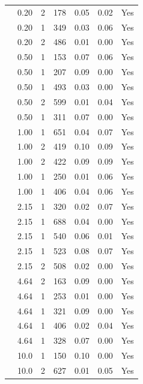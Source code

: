 \begin{longtable}{ | M{2.0cm} | M{2.0cm} | M{1.5cm} | M{1.5cm} | M{2.0cm} | M{2.0cm} | M{1.5cm} | }
                 & 0.20 & 2 & 178 & 0.05 & 0.02 & Yes\\
                 & 0.20 & 1 & 349 & 0.03 & 0.06 & Yes\\
                 & 0.20 & 2 & 486 & 0.01 & 0.00 & Yes\\
                 & 0.50 & 1 & 153 & 0.07 & 0.06 & Yes\\
                 & 0.50 & 1 & 207 & 0.09 & 0.00 & Yes\\
                 & 0.50 & 1 & 493 & 0.03 & 0.00 & Yes\\
                 & 0.50 & 2 & 599 & 0.01 & 0.04 & Yes\\
                 & 0.50 & 1 & 311 & 0.07 & 0.00 & Yes\\
                 & 1.00 & 1 & 651 & 0.04 & 0.07 & Yes\\
                 & 1.00 & 2 & 419 & 0.10 & 0.09 & Yes\\
                 & 1.00 & 2 & 422 & 0.09 & 0.09 & Yes\\
                 & 1.00 & 1 & 250 & 0.01 & 0.06 & Yes\\
                 & 1.00 & 1 & 406 & 0.04 & 0.06 & Yes\\
                 & 2.15 & 1 & 320 & 0.02 & 0.07 & Yes\\
                 & 2.15 & 1 & 688 & 0.04 & 0.00 & Yes\\
                 & 2.15 & 1 & 540 & 0.06 & 0.01 & Yes\\
                 & 2.15 & 1 & 523 & 0.08 & 0.07 & Yes\\
                 & 2.15 & 2 & 508 & 0.02 & 0.00 & Yes\\
                 & 4.64 & 2 & 163 & 0.09 & 0.00 & Yes\\
                 & 4.64 & 1 & 253 & 0.01 & 0.00 & Yes\\
                 & 4.64 & 1 & 321 & 0.09 & 0.00 & Yes\\
                 & 4.64 & 1 & 406 & 0.02 & 0.04 & Yes\\
                 & 4.64 & 1 & 328 & 0.07 & 0.00 & Yes\\
                 & 10.0 & 1 & 150 & 0.10 & 0.00 & Yes\\
                 & 10.0 & 2 & 627 & 0.01 & 0.05 & Yes\\

\end{longtable}
